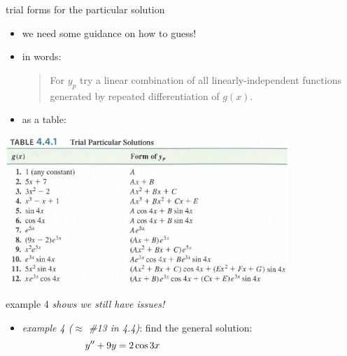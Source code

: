 \documentclass{beamer}
\begin{document}
\begin{frame}{trial forms for the particular solution}

\begin{itemize}
\item we need some guidance on how to guess!
\item in words:

\begin{quotation}
\noindent \alert{For $y_p$ try a linear combination of all linearly-independent functions generated by repeated differentiation of $g(x)$.}
\end{quotation}

\vspace{-3mm}
\item as a table:
\end{itemize}

\hfill \includegraphics[width=0.8\textwidth]{figs/yptable}
\end{frame}


\begin{frame}{example 4 \emph{shows we still have issues!}}

\begin{itemize}
\item \emph{example 4 ($\approx$ \#13 in 4.4)}: find the general solution:
    $$y'' + 9 y = 2 \cos 3x \hspace{50mm}$$
\end{itemize}

\vspace{60mm}
\end{frame}
\end{document}

